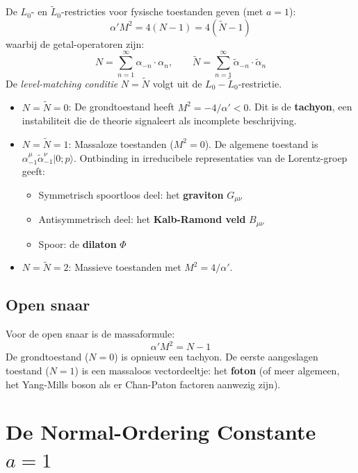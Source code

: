 \documentclass[12pt,a4paper]{article}
\begin{document}
De $L_0$- en $\tilde L_0$-restricties voor fysische toestanden geven (met $a=1$):
\begin{equation}
  \alpha' M^2 = 4(N - 1) = 4(\tilde N - 1)
  \label{eq:massa_gesloten}
\end{equation}
waarbij de getal-operatoren zijn:
\begin{equation}
  N = \sum_{n=1}^\infty \alpha_{-n}\cdot\alpha_n, \qquad \tilde N = \sum_{n=1}^\infty \tilde\alpha_{-n}\cdot\tilde\alpha_n
\end{equation}
De \emph{level-matching conditie} $N = \tilde N$ volgt uit de $L_0 - \tilde L_0$-restrictie.

\begin{itemize}
  \item $N = \tilde N = 0$: De grondtoestand heeft $M^2 = -4/\alpha' < 0$. Dit is de \textbf{tachyon}, een instabiliteit die de theorie signaleert als incomplete beschrijving.
  \item $N = \tilde N = 1$: Massaloze toestanden ($M^2 = 0$). De algemene toestand is $\alpha_{-1}^\mu\tilde\alpha_{-1}^\nu|0;p\rangle$. Ontbinding in irreducibele representaties van de Lorentz-groep geeft:
  \begin{itemize}
    \item Symmetrisch spoortloos deel: het \textbf{graviton} $G_{\mu\nu}$
    \item Antisymmetrisch deel: het \textbf{Kalb-Ramond veld} $B_{\mu\nu}$
    \item Spoor: de \textbf{dilaton} $\Phi$
  \end{itemize}
  \item $N = \tilde N = 2$: Massieve toestanden met $M^2 = 4/\alpha'$.
\end{itemize}

\subsection{Open snaar}

Voor de open snaar is de massaformule:
\begin{equation}
  \alpha' M^2 = N - 1
\end{equation}
De grondtoestand ($N=0$) is opnieuw een tachyon. De eerste aangeslagen toestand ($N=1$) is een massaloos vectordeeltje: het \textbf{foton} (of meer algemeen, het Yang-Mills boson als er Chan-Paton factoren aanwezig zijn).

\section{De Normal-Ordering Constante $a=1$}
\end{document}

